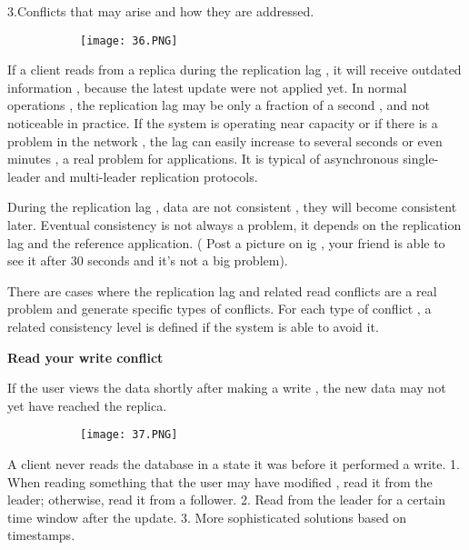 \documentclass{article}
\begin{document}
\vspace{3mm}

3.Conflicts that may arise and how they are addressed.


\begin{figure}[ht!]
  \centering
  \begin{subfigure}[b]{0.25\linewidth}
    \texttt{[image: 36.PNG]}
  \end{subfigure}
\end{figure}


If a client reads from a replica during the replication lag , it will receive outdated information , because the latest update were not applied yet. In normal operations , the replication lag may be only a fraction of a second , and not noticeable in practice.
If the system is operating near capacity or if there is a problem in the network , the lag can easily increase to several seconds or even minutes ,  a real problem for applications. It is typical of asynchronous single-leader and multi-leader replication protocols.

During the replication lag , data are not consistent , they will become consistent later. Eventual consistency is not always a problem, it depends on the replication lag and the reference application. ( Post a picture on ig , your friend is able to see it after 30 seconds and it's not a big problem).

There are cases where the replication lag and related read conflicts are a real problem and generate specific types of conflicts. For each type of conflict , a related consistency level is defined if the system is able to avoid it.

\vspace{3mm}
\textbf{Read your write conflict}

If the user views the data shortly after making a write , the new data may not yet have reached the replica.


\begin{figure}[ht!]
  \centering
  \begin{subfigure}[b]{0.25\linewidth}
    \texttt{[image: 37.PNG]}
  \end{subfigure}
\end{figure}

A client never reads the database in a state it was before it performed a write.
1. When reading something that the user may have modified , read it from the leader; otherwise, read it from a follower.
2. Read from the leader for a certain time window after the update.
3. More sophisticated solutions based on timestamps.
\end{document}
